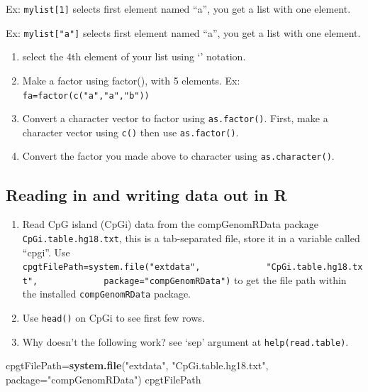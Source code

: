 \documentclass[12pt,]{krantz}
\newenvironment{Shaded}{\begin{snugshade}}{\end{snugshade}}
\newcommand{\DataTypeTok}[1]{\textcolor[rgb]{0.13,0.29,0.53}{#1}}
\newcommand{\KeywordTok}[1]{\textcolor[rgb]{0.13,0.29,0.53}{\textbf{#1}}}
\newcommand{\NormalTok}[1]{#1}
\newcommand{\StringTok}[1]{\textcolor[rgb]{0.31,0.60,0.02}{#1}}
\begin{document}
Ex: \texttt{mylist{[}1{]}} selects first element named ``a'', you get a list with one element.

Ex: \texttt{mylist{[}"a"{]}} selects first element named ``a'', you get a list with one element.

\begin{enumerate}
\def\labelenumi{\arabic{enumi}.}
\setcounter{enumi}{37}
\item
  select the 4th element of your list using `\protect\hyperlink{section-21}{}' notation.
\item
  Make a factor using factor(), with 5 elements.
  Ex: \texttt{fa=factor(c("a","a","b"))}
\item
  Convert a character vector to factor using \texttt{as.factor()}.
  First, make a character vector using \texttt{c()} then use \texttt{as.factor()}.
\item
  Convert the factor you made above to character using \texttt{as.character()}.
\end{enumerate}

\hypertarget{reading-in-and-writing-data-out-in-r}{%
\subsection{Reading in and writing data out in R}\label{reading-in-and-writing-data-out-in-r}}

\begin{enumerate}
\def\labelenumi{\arabic{enumi}.}
\setcounter{enumi}{41}
\item
  Read CpG island (CpGi) data from the compGenomRData package \texttt{CpGi.table.hg18.txt}, this is a tab-separated file, store it in a variable called ``cpgi''. Use \texttt{cpgtFilePath=system.file("extdata",\ \ \ \ \ \ \ \ \ \ \ \ \ "CpGi.table.hg18.txt",\ \ \ \ \ \ \ \ \ \ \ \ \ package="compGenomRData")}
  to get the file path within the installed \texttt{compGenomRData} package.
\item
  Use \texttt{head()} on CpGi to see first few rows.
\item
  Why doesn't the following work? see `sep' argument at \texttt{help(read.table)}.
\end{enumerate}

\begin{Shaded}
\begin{Highlighting}[]
\NormalTok{cpgtFilePath=}\KeywordTok{system.file}\NormalTok{(}\StringTok{"extdata"}\NormalTok{,}
                \StringTok{"CpGi.table.hg18.txt"}\NormalTok{,}
                \DataTypeTok{package=}\StringTok{"compGenomRData"}\NormalTok{)}
\NormalTok{cpgtFilePath}
\end{Highlighting}
\end{Shaded}
\end{document}
